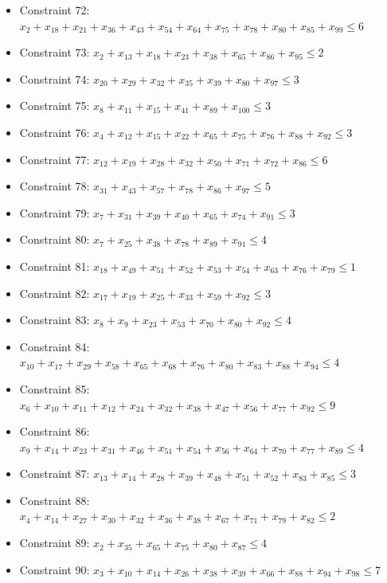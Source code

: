 \documentclass[11pt]{article}
\begin{document}
\begin{itemize}
\item Constraint 72: $x_{2} + x_{18} + x_{21} + x_{36} + x_{43} + x_{54} + x_{64} + x_{75} + x_{78} + x_{80} + x_{85} + x_{99} \le 6$
\item Constraint 73: $x_{2} + x_{13} + x_{18} + x_{23} + x_{38} + x_{65} + x_{86} + x_{95} \le 2$
\item Constraint 74: $x_{20} + x_{29} + x_{32} + x_{35} + x_{39} + x_{80} + x_{97} \le 3$
\item Constraint 75: $x_{8} + x_{11} + x_{15} + x_{41} + x_{89} + x_{100} \le 3$
\item Constraint 76: $x_{4} + x_{12} + x_{15} + x_{22} + x_{65} + x_{75} + x_{76} + x_{88} + x_{92} \le 3$
\item Constraint 77: $x_{12} + x_{19} + x_{28} + x_{32} + x_{50} + x_{71} + x_{72} + x_{86} \le 6$
\item Constraint 78: $x_{31} + x_{43} + x_{57} + x_{78} + x_{86} + x_{97} \le 5$
\item Constraint 79: $x_{7} + x_{31} + x_{39} + x_{40} + x_{65} + x_{74} + x_{91} \le 3$
\item Constraint 80: $x_{7} + x_{25} + x_{38} + x_{78} + x_{89} + x_{91} \le 4$
\item Constraint 81: $x_{18} + x_{49} + x_{51} + x_{52} + x_{53} + x_{54} + x_{63} + x_{76} + x_{79} \le 1$
\item Constraint 82: $x_{17} + x_{19} + x_{25} + x_{33} + x_{59} + x_{92} \le 3$
\item Constraint 83: $x_{8} + x_{9} + x_{23} + x_{53} + x_{70} + x_{80} + x_{92} \le 4$
\item Constraint 84: $x_{10} + x_{17} + x_{29} + x_{58} + x_{65} + x_{68} + x_{76} + x_{80} + x_{83} + x_{88} + x_{94} \le 4$
\item Constraint 85: $x_{6} + x_{10} + x_{11} + x_{12} + x_{24} + x_{32} + x_{38} + x_{47} + x_{56} + x_{77} + x_{92} \le 9$
\item Constraint 86: $x_{9} + x_{14} + x_{23} + x_{31} + x_{46} + x_{51} + x_{54} + x_{56} + x_{64} + x_{70} + x_{77} + x_{89} \le 4$
\item Constraint 87: $x_{13} + x_{14} + x_{28} + x_{39} + x_{48} + x_{51} + x_{52} + x_{83} + x_{85} \le 3$
\item Constraint 88: $x_{4} + x_{14} + x_{27} + x_{30} + x_{32} + x_{36} + x_{38} + x_{67} + x_{71} + x_{79} + x_{82} \le 2$
\item Constraint 89: $x_{2} + x_{35} + x_{65} + x_{75} + x_{80} + x_{87} \le 4$
\item Constraint 90: $x_{3} + x_{10} + x_{14} + x_{26} + x_{38} + x_{39} + x_{66} + x_{88} + x_{94} + x_{98} \le 7$

\end{itemize}
\end{document}

